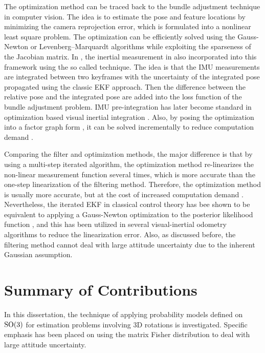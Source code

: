 The optimization method can be traced back to the bundle adjustment technique \cite{triggs1999bundle} in computer vision.
The idea is to estimate the pose and feature locations by minimizing the camera reprojection error, which is formulated into a nonlinear least square problem.
The optimization can be efficiently solved using the Gauss-Newton or Levenberg–Marquardt algorithms while exploiting the sparseness of the Jacobian matrix.
In \cite{forster2016manifold,lupton2011visual}, the inertial measurement in also incorporated into this framework using the so called  technique.
The idea is that the IMU measurements are integrated between two keyframes with the uncertainty of the integrated pose propagated using the classic EKF approach.
Then the difference between the relative pose and the integrated pose are added into the loss function of the bundle adjustment problem.
IMU pre-integration has later become standard in optimization based visual inertial integration \cite{brossard2021associating,mur2017visual,qin2018vins}.
Also, by posing the optimization into a factor graph form \cite{indelman2013information}, it can be solved incrementally to reduce computation demand \cite{kaess2012isam2}.

Comparing the filter and optimization methods, the major difference is that by using a multi-step iterated algorithm, the optimization method re-linearizes the non-linear measurement function several times, which is more accurate than the one-step linearization of the filtering method.
Therefore, the optimization method is usually more accurate, but at the cost of increased computation demand \cite{huang2019visual}.
Nevertheless, the iterated EKF in classical control theory has bee shown to be equivalent to applying a Gauss-Newton optimization to the posterior likelihood function \cite{bell1993iterated}, and this has been utilized in several visual-inertial odometry algorithms \cite{bloesch2017iterated,bloesch2015robust} to reduce the linearization error.
Also, as discussed before, the filtering method cannot deal with large attitude uncertainty due to the inherent Gaussian assumption.

\section{Summary of Contributions}

In this dissertation, the technique of applying probability models defined on $\mathrm{SO}(3)$ for estimation problems involving 3D rotations is investigated.
Specific emphasis has been placed on using the matrix Fisher distribution to deal with large attitude uncertainty.

